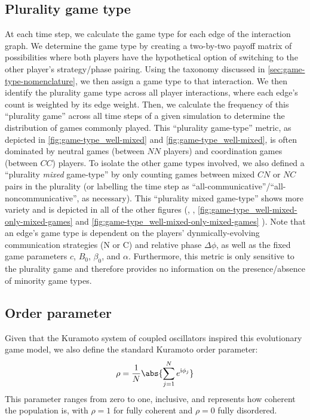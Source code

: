 \documentclass[10pt,letterpaper]{article}
\begin{document}
\subsection{Plurality game type}\label{sec:plurality_game_type}
At each time step, we calculate the game type for each edge
of the interaction graph.
We determine the game type by creating a two-by-two payoff matrix of possibilities
where both players have the hypothetical option of switching to the other player's
strategy/phase pairing.
Using the taxonomy discussed in \cref{sec:game-type-nomenclature},
we then assign a game type to that interaction.
We then identify the plurality game type across all player interactions,
where each edge's count is weighted by its edge weight.
Then, we calculate the frequency of this ``plurality game'' across
all time steps of a given simulation to determine the distribution
of games commonly played.
This ``plurality game-type'' metric, as depicted in
\cref{fig:game-type_well-mixed} and \cref{fig:game-type_well-mixed},
is often dominated by neutral games (between $NN$ players)
and coordination games (between $CC$) players.
To isolate the other game types involved,
we also defined a ``plurality \emph{mixed} game-type''
by only counting games between mixed $CN$ or $NC$ pairs in the plurality
(or labelling the time step as ``all-communicative''/``all-noncommunicative'',
as necessary).
This ``plurality mixed game-type'' shows more variety
and is depicted in all of the other figures
(, ,
\cref{fig:game-type_well-mixed-only-mixed-games}
and \cref{fig:game-type_well-mixed-only-mixed-games}
).
Note that an edge's game type is dependent
on the players' dynmically-evolving communication strategies (N or C)
and relative phase $\Delta \phi$,
as well as the fixed game parameters $c$, $B_0$, $\beta_0$, and $\alpha$.
Furthermore, this metric is only sensitive to the
plurality game and therefore provides no information
on the presence/absence of minority game types.

\subsection{Order parameter}
Given that the Kuramoto system of coupled oscillators
inspired this evolutionary game model,
we also define the standard Kuramoto order parameter:
\begin{equation}
  \rho = \frac{1}{N} \abs{\sum_{j=1}^N e^{\im \phi_j}}
  \label{eq:order_parameter}
\end{equation}
This parameter ranges from zero to one, inclusive,
and represents how coherent the population is,
with $\rho = 1$ for fully coherent and $\rho = 0$ fully disordered.
\end{document}
